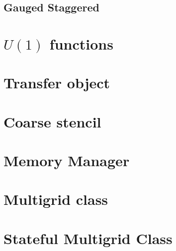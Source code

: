 \documentclass[pdftex,letterpaper,10pt]{article}
\begin{document}
\subsection{Gauged Staggered}

\section{$U(1)$ functions}

\section{Transfer object}

\section{Coarse stencil}

\section{Memory Manager}

\section{Multigrid class}

\section{Stateful Multigrid Class}
\end{document}
